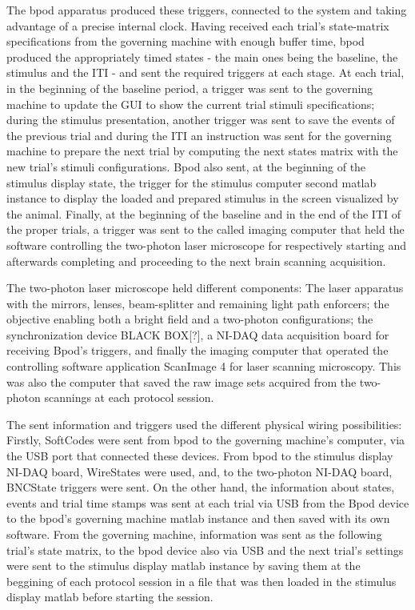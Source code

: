 The bpod apparatus produced these triggers, connected to the system and taking advantage of a precise internal clock. Having received each trial's state-matrix specifications from the governing machine with enough buffer time, bpod produced the appropriately timed states - the main ones being the baseline, the stimulus and the ITI - and sent the required triggers at each stage. At each trial, in the beginning of the baseline period, a trigger was sent to the governing machine to update the GUI to show the current trial stimuli specifications; during the stimulus presentation, another trigger was sent to save the events of the previous trial and during the ITI an instruction was sent for the governing machine to prepare the next trial by computing the next states matrix with the new trial's stimuli configurations. Bpod also sent, at the beginning of the stimulus display state, the trigger for the stimulus computer second matlab instance to display the loaded and prepared stimulus in the screen visualized by the animal. Finally, at the beginning of the baseline and in the end of the ITI of the proper trials, a trigger was sent to the called imaging computer that held the software controlling the two-photon laser microscope for respectively starting and afterwards completing and proceeding to the next brain scanning acquisition. 

The two-photon laser microscope held different components: The laser apparatus with the mirrors, lenses, beam-splitter and remaining light path enforcers; the objective enabling both a bright field and a two-photon configurations; the synchronization device BLACK BOX[?], a NI-DAQ data acquisition board for receiving Bpod's triggers, and finally the imaging computer that operated the controlling software application ScanImage 4 for laser scanning microscopy. This was also the computer that saved the raw image sets acquired from the two-photon scannings at each protocol session.

The sent information and triggers used the different physical wiring possibilities: Firstly, SoftCodes were sent from bpod to the governing machine's computer, via the USB port that connected these devices. From bpod to the stimulus display NI-DAQ board, WireStates were used, and, to the two-photon NI-DAQ board, BNCState triggers were sent. On the other hand, the information about states, events and trial time stamps was sent at each trial via USB from the Bpod device to the bpod's governing machine matlab instance and then saved with its own software. 
From the governing machine, information was sent as the following trial's state matrix, to the bpod device also via USB and the next trial's settings were sent to the stimulus display matlab instance by saving them at the beggining of  each protocol session in a file that was then loaded in the stimulus display matlab before starting the session.